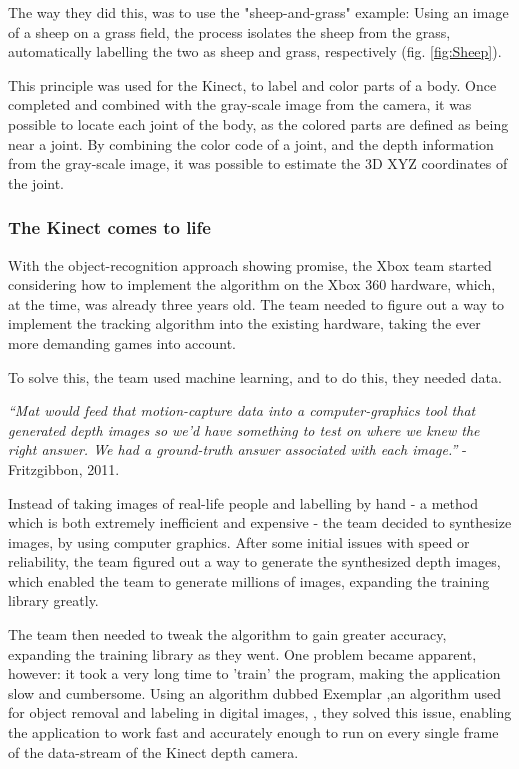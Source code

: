 The way they did this, was to use the "sheep-and-grass" example:
Using an image of a sheep on a grass field, the process isolates the sheep from the grass, automatically labelling the two as sheep and grass, respectively  (fig. \ref{fig:Sheep}).
\bigskip

This principle was used for the Kinect, to label and color parts of a body. Once completed and combined with the gray-scale image from the camera, it was possible to locate each joint of the body, as the colored parts are defined as being near a joint. By combining the color code of a joint, and the depth information from the gray-scale image, it was possible to estimate the 3D XYZ coordinates of the joint.

\subsubsection*{The Kinect comes to life}
With the object-recognition approach showing promise, the Xbox team started considering how to implement the algorithm on the Xbox 360 hardware, which, at the time, was already three years old. The team needed to figure out a way to implement the tracking algorithm into the existing hardware, taking the ever more demanding games into account.

To solve this, the team used machine learning, and to do this, they needed data.	
\bigskip

\textit{“Mat would feed that motion-capture data into a computer-graphics tool that generated depth images so we’d have something to test on where we knew the right answer. We had a ground-truth answer associated with each image.”} - Fritzgibbon, 2011.
\bigskip

Instead of taking images of real-life people and labelling by hand - a method which is both extremely inefficient and expensive - the team decided to synthesize images, by using computer graphics. After some initial issues with speed or reliability, the team figured out a way to generate the synthesized depth images, which enabled the team to generate millions of images, expanding the training library greatly.

The team then needed to tweak the algorithm to gain greater accuracy, expanding the training library as they went. One problem became apparent, however: it took a very long time to 'train' the program, making the application slow and cumbersome. Using an algorithm dubbed Exemplar ,an algorithm used for object removal and labeling in digital images, \parencite{Cheng2005}, they solved this issue, enabling the application to work fast and accurately enough to run on every single frame of the data-stream of the Kinect depth camera.

